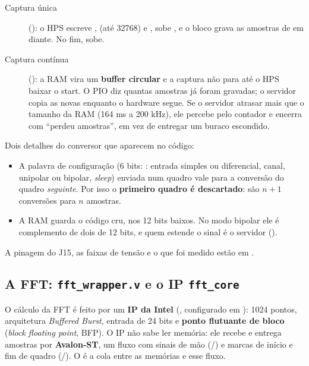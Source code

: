 \documentclass[11pt,a4paper,oneside]{article}
\begin{document}
\begin{description}
  \item[Captura única] (): o HPS escreve
    ,  (até 32768) e , sobe
    , e o bloco grava as amostras de  em diante.
    No fim,  sobe.
  \item[Captura contínua] (): a RAM vira um
    \textbf{buffer circular} e a captura não para até o HPS baixar o start.
    O PIO  diz quantas amostras já foram gravadas; o servidor
    copia as novas enquanto o hardware segue. Se o servidor atrasar mais que o
    tamanho da RAM (164 ms a 200 kHz), ele percebe pelo contador e encerra com
    ``perdeu amostras'', em vez de entregar um buraco escondido.
\end{description}

Dois detalhes do conversor que aparecem no código:

\begin{itemize}
  \item A palavra de configuração (6 bits: : entrada
    simples ou diferencial, canal, unipolar ou bipolar, \emph{sleep}) enviada
    num quadro vale para a conversão do quadro \emph{seguinte}. Por isso o
    \textbf{primeiro quadro é descartado}: são \(n+1\) conversões para \(n\)
    amostras.
  \item A RAM guarda o código cru, nos 12 bits baixos. No modo bipolar ele é
    complemento de dois de 12 bits, e quem estende o sinal é o servidor
    ().
\end{itemize}

A pinagem do J15, as faixas de tensão e o que foi medido estão em
.

\subsection{A FFT: \texttt{fft\_wrapper.v} e o IP \texttt{fft\_core}}

O cálculo da FFT é feito por um \textbf{IP da Intel} (,
configurado em ): 1024 pontos, arquitetura
\emph{Buffered Burst}, entrada de 24 bits e \textbf{ponto flutuante de bloco}
(\emph{block floating point}, BFP). O IP não sabe ler memória: ele recebe e
entrega amostras por \textbf{Avalon-ST}, um fluxo com sinais de mão
(/) e marcas de início e fim de quadro
(/). O  é a cola entre as memórias e esse
fluxo.
\end{document}
